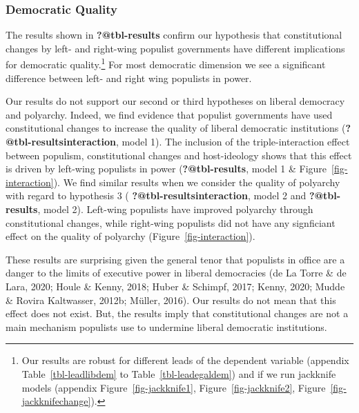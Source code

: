 \documentclass[
  abstract]{article}
\begin{document}
\hypertarget{democratic-quality}{%
\subsubsection{Democratic Quality}\label{democratic-quality}}

The results shown in \textbf{?@tbl-results} confirm our hypothesis that
constitutional changes by left- and right-wing populist governments have
different implications for democratic quality.\footnote{Our results are
  robust for different leads of the dependent variable (appendix
  Table~\ref{tbl-leadlibdem} to Table~\ref{tbl-leadegaldem}) and if we
  run jackknife models (appendix Figure~\ref{fig-jackknife1},
  Figure~\ref{fig-jackknife2}, Figure~\ref{fig-jackknifechange}).} For
most democratic dimension we see a significant difference between left-
and right wing populists in power.

Our results do not support our second or third hypotheses on liberal
democracy and polyarchy. Indeed, we find evidence that populist
governments have used constitutional changes to increase the quality of
liberal democratic institutions (\textbf{?@tbl-resultsinteraction},
model 1). The inclusion of the triple-interaction effect between
populism, constitutional changes and host-ideology shows that this
effect is driven by left-wing populists in power
(\textbf{?@tbl-results}, model 1 \& Figure~\ref{fig-interaction}). We
find similar results when we consider the quality of polyarchy with
regard to hypothesis 3 ( \textbf{?@tbl-resultsinteraction}, model 2 and
\textbf{?@tbl-results}, model 2). Left-wing populists have improved
polyarchy through constitutional changes, while right-wing populists did
not have any signficiant effect on the quality of polyarchy
(Figure~\ref{fig-interaction}).

These results are surprising given the general tenor that populists in
office are a danger to the limits of executive power in liberal
democracies (de La Torre \& de Lara, 2020; Houle \& Kenny, 2018; Huber
\& Schimpf, 2017; Kenny, 2020; Mudde \& Rovira Kaltwasser, 2012b;
Müller, 2016). Our results do not mean that this effect does not exist.
But, the results imply that constitutional changes are not a main
mechanism populists use to undermine liberal democratic institutions.

\blandscape

\elandscape
\end{document}
